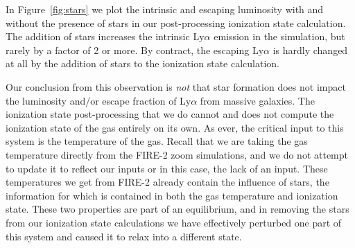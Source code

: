In Figure~\ref{fig:stars} we plot the intrinsic and escaping luminosity with and without the presence of stars in our post-processing ionization state calculation.
The addition of stars increases the intrinsic Ly$\alpha$ emission in the simulation, but rarely by a factor of 2 or more.
By contract, the escaping Ly$\alpha$ is hardly changed at all by the addition of stars to the ionization state calculation.

Our conclusion from this observation is \emph{not} that star formation does not impact the luminosity and/or escape fraction of Ly$\alpha$ from massive galaxies.
The ionization state post-processing that we do cannot and does not compute the ionization state of the gas entirely on its own.
As ever, the critical input to this system is the temperature of the gas.
Recall that we are taking the gas temperature directly from the FIRE-2 zoom simulations, and we do not attempt to update it to reflect our inputs or in this case, the lack of an input.
These temperatures we get from FIRE-2 already contain the influence of stars, the information for which is contained in both the gas temperature and ionization state.
These two properties are part of an equilibrium, and in removing the stars from our ionization state calculations we have effectively perturbed one part of this system and caused it to relax into a different state.

